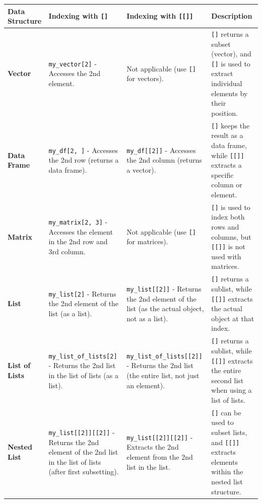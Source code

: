\documentclass[
]{book}
\begin{document}
\begin{longtable}[]{@{}
  >{\raggedright\arraybackslash}p{}
  >{\raggedright\arraybackslash}p{}
  >{\raggedright\arraybackslash}p{}
  >{\raggedright\arraybackslash}p{}@{}}
\toprule\noalign{}
\begin{minipage}[b]{\linewidth}\raggedright
\textbf{Data Structure}
\end{minipage} & \begin{minipage}[b]{\linewidth}\raggedright
\textbf{Indexing with \texttt{{[}{]}}}
\end{minipage} & \begin{minipage}[b]{\linewidth}\raggedright
\textbf{Indexing with \texttt{{[}{[}{]}{]}}}
\end{minipage} & \begin{minipage}[b]{\linewidth}\raggedright
\textbf{Description}
\end{minipage} \\
\midrule\noalign{}
\endhead
\bottomrule\noalign{}
\endlastfoot
\textbf{Vector} & \texttt{my\_vector{[}2{]}} - Accesses the 2nd element. & Not applicable (use \texttt{{[}{]}} for vectors). & \texttt{{[}{]}} returns a subset (vector), and \texttt{{[}{]}} is used to extract individual elements by their position. \\
\textbf{Data Frame} & \texttt{my\_df{[}2,\ {]}} - Accesses the 2nd row (returns a data frame). & \texttt{my\_df{[}{[}2{]}{]}} - Accesses the 2nd column (returns a vector). & \texttt{{[}{]}} keeps the result as a data frame, while \texttt{{[}{[}{]}{]}} extracts a specific column or element. \\
\textbf{Matrix} & \texttt{my\_matrix{[}2,\ 3{]}} - Accesses the element in the 2nd row and 3rd column. & Not applicable (use \texttt{{[}{]}} for matrices). & \texttt{{[}{]}} is used to index both rows and columns, but \texttt{{[}{[}{]}{]}} is not used with matrices. \\
\textbf{List} & \texttt{my\_list{[}2{]}} - Returns the 2nd element of the list (as a list). & \texttt{my\_list{[}{[}2{]}{]}} - Returns the 2nd element of the list (as the actual object, not as a list). & \texttt{{[}{]}} returns a sublist, while \texttt{{[}{[}{]}{]}} extracts the actual object at that index. \\
\textbf{List of Lists} & \texttt{my\_list\_of\_lists{[}2{]}} - Returns the 2nd list in the list of lists (as a list). & \texttt{my\_list\_of\_lists{[}{[}2{]}{]}} - Returns the 2nd list (the entire list, not just an element). & \texttt{{[}{]}} returns a sublist, while \texttt{{[}{[}{]}{]}} extracts the entire second list when using a list of lists. \\
\textbf{Nested List} & \texttt{my\_list{[}{[}2{]}{]}{[}{[}2{]}{]}} - Returns the 2nd element of the 2nd list in the list of lists (after first subsetting). & \texttt{my\_list{[}{[}2{]}{]}{[}{[}2{]}{]}} - Extracts the 2nd element from the 2nd list in the list. & \texttt{{[}{]}} can be used to subset lists, and \texttt{{[}{[}{]}{]}} extracts elements within the nested list structure. \\
\end{longtable}
\end{document}
